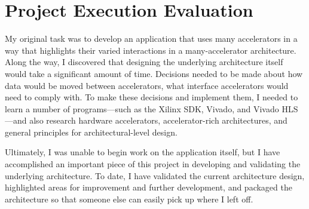 \section{Project Execution Evaluation}
My original task was to develop an application that uses many accelerators in a way that highlights their varied interactions in a many-accelerator architecture. Along the way, I discovered that designing the underlying architecture itself would take a significant amount of time. Decisions needed to be made about how data would be moved between accelerators, what interface accelerators would need to comply with. To make these decisions and implement them, I needed to learn a number of programs---such as the Xilinx SDK, Vivado, and Vivado HLS---and also research hardware accelerators, accelerator-rich architectures, and general principles for architectural-level design.

Ultimately, I was unable to begin work on the application itself, but I have accomplished an important piece of this project in developing and validating the underlying architecture. To date, I have validated the current architecture design, highlighted areas for improvement and further development, and packaged the architecture so that someone else can easily pick up where I left off.
